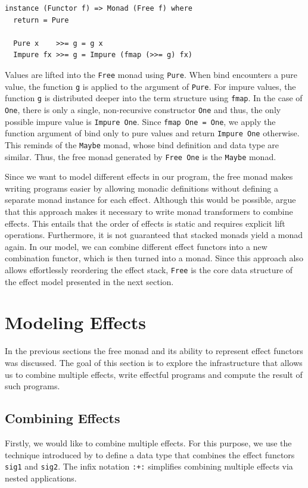 \documentclass[a4paper, 11pt, fleqn, twoside, abstract=on]{scrreprt}
\newcommand{\hinl}[1]{\texttt{#1}}
\newcommand{\cinl}[1]{\texttt{#1}}
\begin{document}
\begin{verbatim}
instance (Functor f) => Monad (Free f) where
  return = Pure

  Pure x    >>= g = g x
  Impure fx >>= g = Impure (fmap (>>= g) fx)
\end{verbatim}

Values are lifted into the \cinl{Free} monad using \cinl{Pure}.
When bind encounters a pure value, the function \hinl{g} is applied to the argument of \hinl{Pure}.
For impure values, the function \hinl{g} is distributed deeper into the term structure using \hinl{fmap}.
In the case of \hinl{One}, there is only a single, non-recursive constructor \hinl{One} and thus, the only possible impure value is \hinl{Impure One}.
Since \hinl{fmap One = One}, we apply the function argument of bind only to pure values and return \cinl{Impure One} otherwise.
This reminds of the \hinl{Maybe} monad, whose bind definition and data type are similar.
Thus, the free monad generated by \hinl{Free One} is the \hinl{Maybe} monad.


Since we want to model different effects in our program, the free monad makes writing programs easier by allowing monadic definitions without defining a separate monad instance for each effect.
Although this would be possible, \citet{kammar2013handlers} argue that this approach makes it necessary to write monad transformers to combine effects.
This entails that the order of effects is static and requires explicit lift operations.
Furthermore, it is not guaranteed that stacked monads yield a monad again.
In our model, we can combine different effect functors into a new combination functor, which is then turned into a monad.
Since this approach also allows effortlessly reordering the effect stack, \hinl{Free} is the core data structure of the effect model presented in the next section.

\section{Modeling Effects}
In the previous sections the free monad and its ability to represent effect functors was discussed.
The goal of this section is to explore the infrastructure that allows us to combine multiple effects, write effectful programs and compute the result of such programs.

\subsection{Combining Effects}
Firstly, we would like to combine multiple effects.
For this purpose, we use the technique introduced by \citet{swierstra2008} to define a data type that combines the effect functors \hinl{sig1} and \hinl{sig2}.
The infix notation \hinl{:+:} simplifies combining multiple effects via nested applications.
\end{document}

